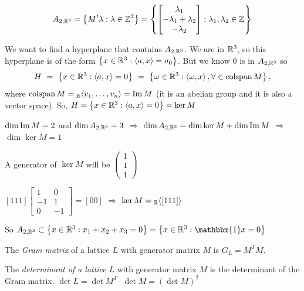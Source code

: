 \begin{displaymath}
	A_{2,\mathbb{R}^{3}}=\left\{M'\lambda:\lambda\in\mathbb{Z}^{2}\right\}=\left\{\begin{bmatrix}
	\lambda_1 \\
	-\lambda_1 + \lambda_2 \\
	-\lambda_2 \end{bmatrix}:\lambda_1,\lambda_2\in\mathbb{Z}\right\}
\end{displaymath}

We want to find a hyperplane that contains $A_{2,\mathbb{R}^{3}}$. We are in $\mathbb{R}^{3}$, so this
hyperplane is of the form $\left\{x\in\mathbb{R}^{3}:\left\langle
    a,x\right\rangle=a_0\right\}$. But we know $0$ is in $A_{2,\mathbb{R}^{3}}$ so
\[
  H \ = \ 
  \left\{x\in\RR^{3}:\left\langle a,x\right\rangle=0\right\} 
  \ = \ 
  \left\{\omega\in\RR^{3}:\left\langle \omega,x\right\rangle, \forall \in \colspan
    M\right\},
\]
 where $\operatorname{colspan}
M={}_{\mathbb{R}}\!\left\langle v_1,\ldots,v_n \right\rangle=\operatorname{Im} M$ (it is an abelian group and it is
also a vector space). So, $H=\left\{x\in\mathbb{R}^{3}: \left\langle
    a,x\right\rangle=0\right\}=\ker M$

$\dim \operatorname{Im} M=2$ and $\dim A_{2,\mathbb{R}^{3}}=3$ $\Longrightarrow$ $\dim A_{2,\mathbb{R}^{3}}=\dim \ker M +\dim \operatorname{Im} M$ $\Longrightarrow$ $\dim \ker M=1$

A generator of $\ker M$ will be $\left(\begin{smallmatrix}
1 \\
1 \\
1 \end{smallmatrix}\right)$

$\left[1 1 1\right]\left[\begin{smallmatrix}
1 & 0 \\
-1 & 1 \\
0 & -1 \end{smallmatrix}\right]=\left[0 0\right]$ $\Rightarrow$ $\ker M= {}_{\mathbb{R}}\!\left\langle \left[1 1 1\right]\right\rangle$

So $A_{2,\RR^{3}}\subset\left\{x\in\RR^{3}: x_1+x_2+x_3=0\right\}=\left\{x\in\RR^{3}: \mathbbm{1}x=0\right\}$


\begin{definition}
The \emph{Gram matrix} of a lattice $L$ with generator matrix $M$ is $G_L=M^{T}M$.
\end{definition}


\begin{definition}
The \emph{determinant of a lattice} $L$ with generator matrix $M$ is the determinant of the Gram matrix.
$\det L=\det M^{T}\cdot \det M=\left(\det M\right)^{2} $
\end{definition}


